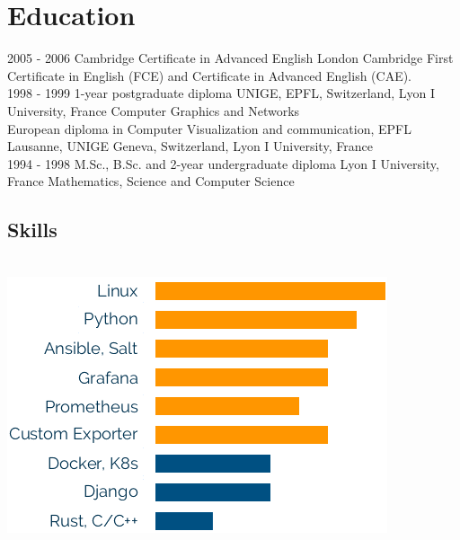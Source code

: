 \documentclass[]{cv-class}
\begin{document}
\section{Education}
\begin{entrylist}
  \entry
    {2005 - 2006}
    {Cambridge Certificate in Advanced English}
    {London}
    {Cambridge First Certificate in English (FCE) and Certificate in Advanced English (CAE).\\}
  \entry
    {1998 - 1999}
    {1-year postgraduate diploma}
    {UNIGE, EPFL, Switzerland, Lyon I University, France}
    {Computer Graphics and Networks\\
    European diploma in Computer Visualization and communication, EPFL Lausanne, UNIGE Geneva, Switzerland, Lyon I University, France\\}
  \entry
    {1994 - 1998}
    {M.Sc., B.Sc. and 2-year undergraduate diploma}
    {Lyon I University, France}
    {Mathematics, Science and Computer Science\\}
\end{entrylist}

\begin{aside}
  \vspace{1cm}
  \section{Skills}
    \\
    \includegraphics[scale=0.68]{img/skills2.png}    ~
\end{aside}
\end{document}
